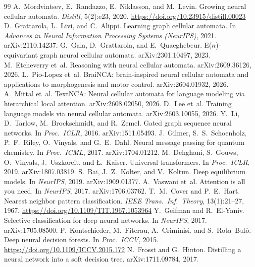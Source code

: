 \documentclass[10pt,twocolumn,letterpaper]{article}
\begin{document}
\begin{thebibliography}{99}\small
{} A.~Mordvintsev, E.~Randazzo, E.~Niklasson, and M.~Levin. Growing neural cellular automata. \emph{Distill}, 5(2):e23, 2020. \url{https://doi.org/10.23915/distill.00023}
 D.~Grattarola, L.~Livi, and C.~Alippi. Learning graph cellular automata. In \emph{Advances in Neural Information Processing Systems (NeurIPS)}, 2021. arXiv:2110.14237.
 G.~Gala, D.~Grattarola, and E.~Quaeghebeur. E($n$)-equivariant graph neural cellular automata. arXiv:2301.10497, 2023.
 M.~Etcheverry et~al. Reasoning with neural cellular automata. arXiv:2609.36126, 2026.
 L.~Pio-Lopez et~al. BraiNCA: brain-inspired neural cellular automata and applications to morphogenesis and motor control. arXiv:2604.01932, 2026.
 A.~Mittal et~al. TextNCA: Neural cellular automata for language modeling via hierarchical local attention. arXiv:2608.02050, 2026.
 D.~Lee et~al. Training language models via neural cellular automata. arXiv:2603.10055, 2026.
 Y.~Li, D.~Tarlow, M.~Brockschmidt, and R.~Zemel. Gated graph sequence neural networks. In \emph{Proc.\ ICLR}, 2016. arXiv:1511.05493.
 J.~Gilmer, S.~S.~Schoenholz, P.~F.~Riley, O.~Vinyals, and G.~E.~Dahl. Neural message passing for quantum chemistry. In \emph{Proc.\ ICML}, 2017. arXiv:1704.01212.
 M.~Dehghani, S.~Gouws, O.~Vinyals, J.~Uszkoreit, and {\L}.~Kaiser. Universal transformers. In \emph{Proc.\ ICLR}, 2019. arXiv:1807.03819.
 S.~Bai, J.~Z.~Kolter, and V.~Koltun. Deep equilibrium models. In \emph{NeurIPS}, 2019. arXiv:1909.01377.
 A.~Vaswani et~al. Attention is all you need. In \emph{NeurIPS}, 2017. arXiv:1706.03762.
 T.~M.~Cover and P.~E.~Hart. Nearest neighbor pattern classification. \emph{IEEE Trans.\ Inf.\ Theory}, 13(1):21--27, 1967. \url{https://doi.org/10.1109/TIT.1967.1053964}
 Y.~Geifman and R.~El-Yaniv. Selective classification for deep neural networks. In \emph{NeurIPS}, 2017. arXiv:1705.08500.
 P.~Kontschieder, M.~Fiterau, A.~Criminisi, and S.~Rota~Bul\`o. Deep neural decision forests. In \emph{Proc.\ ICCV}, 2015. \url{https://doi.org/10.1109/ICCV.2015.172}
 N.~Frosst and G.~Hinton. Distilling a neural network into a soft decision tree. arXiv:1711.09784, 2017.

\end{thebibliography}
\end{document}

